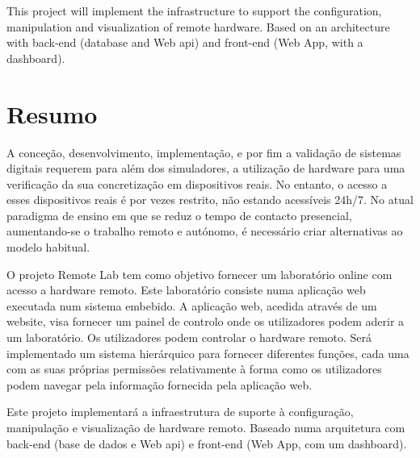 \documentclass[a4paper,openright,twoside,11pt]{report}
\begin{document}
This project will implement the infrastructure to support the configuration, manipulation and visualization
of remote hardware. Based on an architecture with back-end (database and Web \acs{api}) and front-end (Web App, with a dashboard). 

\cleardoublepage
\chapter*{Resumo}
A conceção, desenvolvimento, implementação, e por fim a validação de sistemas digitais 
requerem para além dos simuladores, a utilização de hardware para uma verificação da sua 
concretização em dispositivos reais. No entanto, o acesso a esses dispositivos reais é por 
vezes restrito, não estando acessíveis 24h/7. No atual paradigma de ensino em que se reduz 
o tempo de contacto presencial, aumentando-se o trabalho remoto e autónomo, é necessário criar alternativas 
ao modelo habitual. 

O projeto Remote Lab tem como objetivo fornecer um laboratório online com acesso a hardware remoto.
Este laboratório consiste numa aplicação web executada num sistema embebido. A aplicação web, acedida 
através de um website, visa fornecer um painel de controlo onde os utilizadores podem aderir a um laboratório. 
Os utilizadores podem controlar o hardware remoto. Será implementado um sistema hierárquico para 
fornecer diferentes funções, cada uma com as suas próprias permissões relativamente à forma como os utilizadores 
podem navegar pela informação fornecida pela aplicação web.

Este projeto implementará a infraestrutura de suporte à configuração, manipulação e visualização de hardware remoto. 
Baseado numa arquitetura com back-end (base de dados e Web \acs{api}) e front-end (Web App, com um dashboard).



\tableofcontents 

\cleardoublepage
{}
{}
\listoffigures
\end{document}
